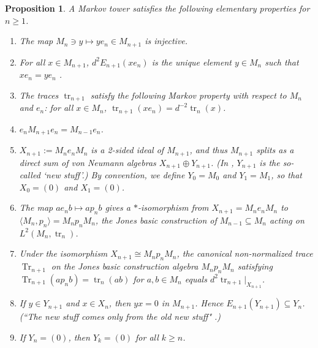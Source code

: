 \documentclass[11pt]{article}
\theoremstyle{plain}
\newtheorem{prop}[thm]{Proposition}
\theoremstyle{definition}
\DeclareMathOperator{\Tr}{Tr}
\DeclareMathOperator{\tr}{tr}
\begin{document}
\begin{prop}\label{prop:ElementaryMarkov} A Markov tower satisfies the following elementary properties for $n\geq 1$.
\begin{enumerate}[label={\rm(EP\arabic*)}]
\item
\label{EP:Injective}
The map $M_{n}\ni y\mapsto ye_n \in M_{n+1}$ is injective.

\item
\label{EP:UniquePullDown}
For all $x\in M_{n+1}$, $d^{2}E_{n+1}(x e_n)$ is the unique element $y\in M_n$ such that $x e_n = ye_n$ \cite[Lem.~1.2]{MR860811}.

\item
\label{EP:MarkovTraces}
The traces $\tr_{n+1}$ satisfy the following \emph{Markov property} with respect to $M_n$ and $e_n$: for all $x\in M_n$, $\tr_{n+1}(xe_n) = d^{-2} \tr_n(x)$.

\item
\label{EP:CompressM_{n+1}}
$e_n M_{n+1}e_n = M_{n-1}e_n$.

\item
\label{EP:2SidedIdeal}
$X_{n+1}:=M_n e_n M_n$ is a 2-sided ideal of $M_{n+1}$, and thus $M_{n+1}$ splits as a direct sum of von Neumann algebras $X_{n+1}\oplus Y_{n+1}$.
(In \cite[Thm.~4.1.4 and Thm.~4.6.3]{MR999799}, $Y_{n+1}$ is the so-called `new stuff'.)
By convention, we define $Y_0 = M_0$ and $Y_1 = M_1$, so that $X_0 = (0)$ and $X_1 = (0)$.

\item
\label{EP:BasicContruction}
The map $ae_n b\mapsto ap_n b$ gives a $*$-isomorphism from $X_{n+1}=M_n e_n M_n$ to $\langle M_n , p_n\rangle=M_np_nM_n$, the Jones basic construction of $M_{n-1} \subseteq M_n$ acting on $L^2(M_n,\tr_n)$.

\item
\label{EP:OtherMarkovDef}
Under the isomorphism $X_{n+1} \cong M_n p_n M_n$, the canonical non-normalized trace $\Tr_{n+1}$ on the Jones basic construction algebra $M_np_nM_n$ satisfying $\Tr_{n+1}(ap_nb) = \tr_n(ab)$ for $a,b\in M_n$ equals $d^2 \tr_{n+1}|_{X_{n+1}}$.

\item
\label{EP:NewStuff}
If $y\in Y_{n+1}$ and $x\in X_{n}$, then $yx = 0$ in $M_{n+1}$.
Hence $E_{n+1}(Y_{n+1}) \subseteq Y_{n}$.
(``The new stuff comes only from the old new stuff" \cite{MR999799}.)

\item
\label{EP:FiniteDepth}
If $Y_n =(0)$, then $Y_{k} = (0)$ for all $k\geq n$.

\end{enumerate}
\end{prop}
\end{document}

